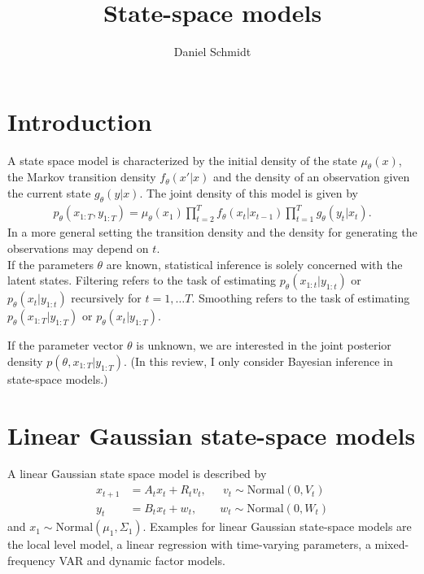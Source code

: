 \documentclass[12pt,a4paper]{scrartcl}
\title{State-space models}
\author{Daniel Schmidt}
\begin{document}
	
\maketitle

\section{Introduction}

A state space model is characterized by the initial density of the state $\mu_\theta(x)$, the Markov transition density $f_\theta(x'|x)$ and the density of an observation given the current state $g_\theta(y|x)$. The joint density of this model is given by
\begin{align*}
p_\theta(x_{1:T}, y_{1:T}) = \mu_\theta(x_1) \prod_{t=2}^{T}f_{\theta}(x_t|x_{t-1}) \prod_{t=1}^{T} g_{\theta}(y_t|x_t).
\end{align*}
In a more general setting the transition density and the density for generating the observations may depend on $t$.\\

If the parameters $\theta$ are known, statistical inference is solely concerned with the latent states. Filtering refers to the task of estimating $p_\theta(x_{1:t}|y_{1:t})$ or $p_\theta(x_t|y_{1:t})$ recursively for $t=1,\dots T$. Smoothing refers to the task of estimating $p_\theta(x_{1:T}|y_{1:T})$ or $p_\theta(x_t|y_{1:T})$. 

If the parameter vector $\theta$ is unknown, we are interested in the joint posterior density $p(\theta, x_{1:T}|y_{1:T})$. (In this review, I only consider Bayesian inference in state-space models.)

\section{Linear Gaussian state-space models}

A linear Gaussian state space model is described by
\begin{align*}
x_{t+1} &= A_t x_t + R_t v_t, \;\,\quad v_t \sim \mathrm{Normal}(0, V_t)\\
y_t &= B_t x_t + w_t, \qquad w_t \sim \mathrm{Normal}(0, W_t)
\end{align*}
and $x_1 \sim \mathrm{Normal}(\mu_1, \Sigma_1)$. Examples for linear Gaussian state-space models are the local level model, a linear regression with time-varying parameters, a mixed-frequency VAR and dynamic factor models.

\end{document}
